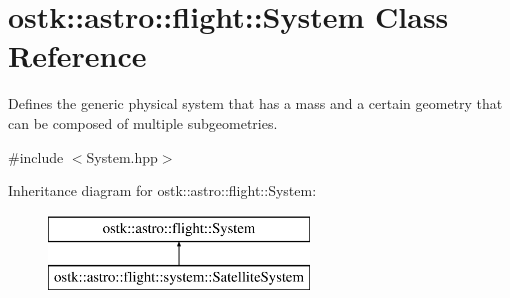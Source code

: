 \hypertarget{classostk_1_1astro_1_1flight_1_1_system}{}\section{ostk\+:\+:astro\+:\+:flight\+:\+:System Class Reference}
\label{classostk_1_1astro_1_1flight_1_1_system}


Defines the generic physical system that has a mass and a certain geometry that can be composed of multiple subgeometries.  




{\ttfamily \#include $<$System.\+hpp$>$}

Inheritance diagram for ostk\+:\+:astro\+:\+:flight\+:\+:System\+:\begin{figure}[H]
\begin{center}
\leavevmode
\includegraphics[height=2.000000cm]{classostk_1_1astro_1_1flight_1_1_system}
\end{center}
\end{figure}
